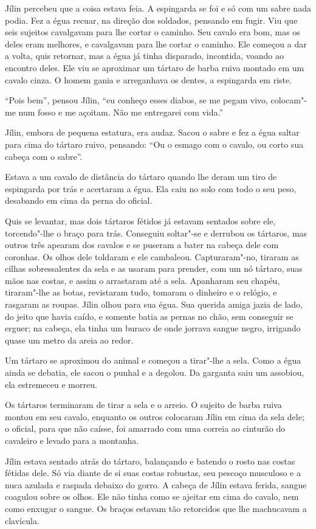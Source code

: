 Jílin percebeu que a coisa estava feia. A espingarda se foi e só com um
sabre nada podia. Fez a égua recuar, na direção dos soldados,
pensando em fugir. Viu que seis sujeitos cavalgavam para lhe cortar o
caminho. Seu cavalo era bom, mas os deles eram melhores, e cavalgavam
para lhe cortar o caminho. Ele começou a dar a volta, quis retornar, mas
a égua já tinha disparado, incontida, voando ao encontro deles. Ele viu
se aproximar um tártaro de barba ruiva montado em um cavalo cinza. O
homem gania e arreganhava os dentes, a espingarda em riste.

``Pois bem'', pensou Jílin, ``eu conheço esses diabos, se me pegam vivo,
colocam"-me num fosso e me açoitam. Não me entregarei com vida.''

Jílin, embora de pequena estatura, era audaz. Sacou o sabre e fez a égua
saltar para cima do tártaro ruivo, pensando: ``Ou o esmago com o cavalo,
ou corto sua cabeça com o sabre''.

Estava a um cavalo de distância do tártaro quando lhe deram um tiro de
espingarda por trás e acertaram a égua. Ela caiu no solo com todo o seu
peso, desabando em cima da perna do oficial.

Quis se levantar, mas dois tártaros fétidos já estavam sentados sobre
ele, torcendo"-lhe o braço para trás. Conseguiu soltar"-se e derrubou os
tártaros, mas outros três apearam dos cavalos e se puseram a bater na
cabeça dele com coronhas. Os olhos dele toldaram e ele cambaleou.
Capturaram"-no, tiraram as cilhas sobressalentes da sela e as usaram para prender, com um nó tártaro, suas mãos nas costas, e assim o arrastaram
até a sela. Apanharam seu chapéu, tiraram"-lhe as botas,
revistaram tudo, tomaram o dinheiro e o relógio, e rasgaram as roupas.
Jílin olhou para sua égua. Sua querida amiga jazia de lado, do jeito que
havia caído, e somente batia as pernas no chão, sem conseguir se erguer;
na cabeça, ela tinha um buraco de onde jorrava sangue negro, irrigando quase um metro da areia ao redor.

Um tártaro se aproximou do animal e começou a tirar"-lhe a sela. Como a
égua ainda se debatia, ele sacou o punhal e a degolou. Da garganta saiu um assobiou, ela estremeceu e morreu.

Os tártaros terminaram de tirar a sela e o arreio. O sujeito de barba
ruiva montou em seu cavalo, enquanto os outros colocaram Jílin em cima
da sela dele; o oficial, para que não caísse, foi amarrado com uma
correia ao cinturão do cavaleiro e levado para a montanha.

Jílin estava sentado atrás do tártaro, balançando e batendo o rosto nas
costas fétidas dele. Só via diante de si suas costas robustas,
seu pescoço musculoso e a nuca azulada e raspada debaixo do gorro. A
cabeça de Jílin estava ferida, sangue coagulou sobre os olhos. Ele não
tinha como se ajeitar em cima do cavalo, nem como enxugar o sangue. Os
braços estavam tão retorcidos que lhe machucavam a clavícula.

